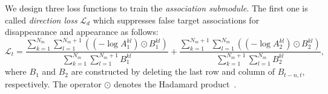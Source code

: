 \documentclass[acmsmall]{acmart}
\begin{document}
{
We design three loss functions to train the \emph{association submodule}.
The first one is called
}
\emph{direction loss} $\mathcal L_{d}$ which suppresses false target associations for disappearance and appearance as follows: 
\begin{equation} \label{equ:direction_loss}
\mathcal L_t = \frac{\sum_{k=1}^{N_m} \sum_{l=1}^{N_m+1} \left( \left(-\log { A_1^{kl}} \right) \odot {B}_1^{kl} \right)}{ \sum_{k=1}^{N_m} \sum_{l=1}^{N_m+1} B_1^{kl} }  
+ \frac{ \sum_{k=1}^{N_m+1} \sum_{l=1}^{N_m} \left( \left(-\log { A_2^{kl}} \right) \odot {B}_2^{kl} \right)}{\sum_{k=1}^{N_m+1} \sum_{l=1}^{N_m} B_2^{kl}},
\end{equation}
where $B_1$ and $B_2$ are constructed by deleting the last row and column of $B_{t-n,t}$, respectively. 
The operator $\odot$ denotes the Hadamard product~\cite{hadamard}. 
\end{document}
